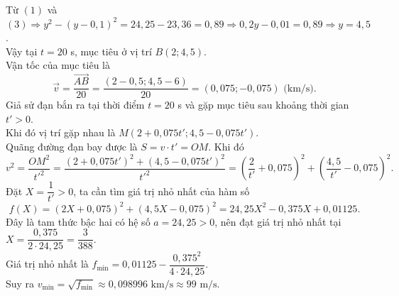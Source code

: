 \begin{ex}
{		Từ $(1)$ và $(3) \Rightarrow y^2 - (y-0{,}1)^2 = 24{,}25 - 23{,}36 = 0{,}89 \Rightarrow 0{,}2y - 0{,}01 = 0{,}89 \Rightarrow y = 4{,}5$.\\
		Vậy tại $t=20$ s, mục tiêu ở vị trí $B(2; 4{,}5)$.\\
		Vận tốc của mục tiêu là
		\[\overrightarrow{v} = \dfrac{\overrightarrow{AB}}{20} = \dfrac{(2 - 0{,}5; 4{,}5 - 6)}{20}=(0{,}075; -0{,}075) \text{ (km/s)}.\]
		Giả sử đạn bắn ra tại thời điểm $t=20$ s và gặp mục tiêu sau khoảng thời gian $t' > 0$.\\
		Khi đó vị trí gặp nhau là $M(2 + 0{,}075t'; 4{,}5 - 0{,}075t')$.\\
		Quãng đường đạn bay được là $S = v \cdot t' = OM$.
		Khi đó
		\[v^2 = \dfrac{OM^2}{t'^2} = \dfrac{(2 + 0{,}075t')^2 + (4{,}5 - 0{,}075t')^2}{t'^2} = \left(\dfrac{2}{t'} + 0{,}075\right)^2 + \left(\dfrac{4{,}5}{t'} - 0{,}075\right)^2.\]
		Đặt $X = \dfrac{1}{t'} > 0$, ta cần tìm giá trị nhỏ nhất của hàm số
		\[f(X) = (2X + 0{,}075)^2 + (4{,}5X - 0{,}075)^2 = 24{,}25X^2 - 0{,}375X + 0{,}01125.\]
		Đây là tam thức bậc hai có hệ số $a = 24{,}25 > 0$, nên đạt giá trị nhỏ nhất tại $X = \dfrac{0{,}375}{2 \cdot 24{,}25} = \dfrac{3}{388}$.\\
		Giá trị nhỏ nhất là $f_{\min} = 0{,}01125 - \dfrac{0{,}375^2}{4 \cdot 24{,}25}$.\\
		Suy ra $v_{\min} = \sqrt{f_{\min}} \approx 0{,}098996 \text{ km/s} \approx 99 \text{ m/s}.$
	}
\end{ex}

